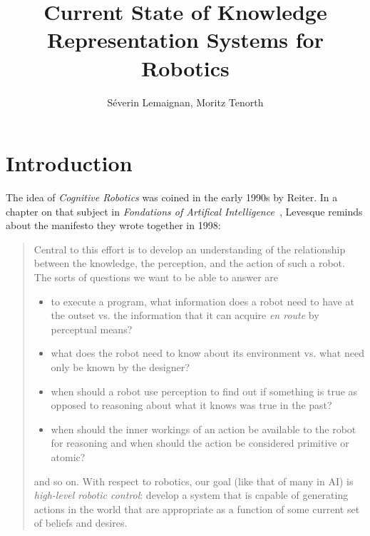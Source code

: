 \documentclass[a4paper, twocolumn]{article}
\title{Current State of Knowledge Representation Systems for Robotics}
\author{Séverin Lemaignan, Moritz Tenorth}
\begin{document}
\maketitle
\tableofcontents

\section{Introduction}
\label{sect|intro}

The idea of \emph{Cognitive Robotics} was coined in the early 1990s by Reiter.
In a chapter on that subject in \emph{Fondations of Artifical
Intelligence}~\cite{Levesque2008}, Levesque reminds about the manifesto they
wrote together in 1998:

\begin{quotation}

	Central to this effort is to develop an understanding of the relationship
	between the knowledge, the perception, and the action of such a robot. The
	sorts of questions we want to be able to answer are

	\begin{itemize} 
	
		\item to execute a program, what information does a robot need to have
		at the outset vs. the information that it can acquire \emph{en route}
		by perceptual means?

		\item what does the robot need to know about its environment vs. what
		need only be known by the designer?

		\item when should a robot use perception to find out if something is
		true as opposed to reasoning about what it knows was true in the past?

		\item when should the inner workings of an action be available to the
		robot for reasoning and when should the action be considered primitive
		or atomic?

	\end{itemize}

	and so on. With respect to robotics, our goal (like that of many in AI) is
	\emph{high-level robotic control}: develop a system that is capable of
	generating actions in the world that are appropriate as a function of some
	current set of beliefs and desires.

\end{quotation}
\end{document}
